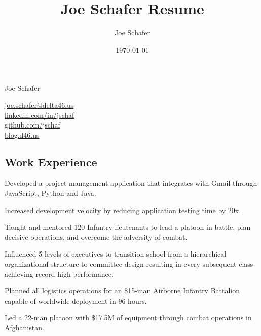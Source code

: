 \documentclass[letterpaper,11pt]{jschaf-resume}
\title{Joe Schafer Resume}
\author{Joe Schafer}
\date{\today}
\makeatletter
\newcommand*{\emailLink}{\href{mailto:joe.schafer@delta46.us}{joe.schafer@delta46.us}}
\newcommand*{\linkedInLink}{\href{http://linkedin.com/in/jschaf}{linkedin.com/in/jschaf}}
\newcommand*{\githubLink}{\href{http://github.com/jschaf}{github.com/jschaf}}
\newcommand*{\blogLink}{\href{http://blog.d46.us}{blog.d46.us}}
\newcommand*{\action}[1]{{\semibold #1}}
\makeatother
\begin{document}

\setlength{\columnsep}{3em}

\begin{paracol}{2}
{\fontfamily{\sfdefault}\fontsize{36px}{48px}\selectfont Joe Schafer}

\switchcolumn
{\fontfamily\sfdefault\selectfont
\emailLink\\
\linkedInLink\\
\githubLink\\
\blogLink\\
}
\end{paracol}

\begin{paracol}{2}
\section*{Work Experience}

\vspace{-12pt}
\begin{workitems}
  \item \action{Developed} a project management application that integrates with Gmail
    through JavaScript, Python and Java.
  \item \action{Increased} development velocity by reducing application testing time by
    20x.
\end{workitems}

\begin{workitems}
\item \action{Taught} and \action{mentored} 120 Infantry lieutenants to lead a
  platoon in battle, plan decisive operations, and overcome the adversity of
  combat.
\item \action{Influenced} 5 levels of executives to transition school from a
  hierarchical organizational structure to committee design resulting in every
  subsequent class achieving record high performance.
\end{workitems}

\begin{workitems}
\item \action{Planned} all logistics operations for an 815-man Airborne Infantry
  Battalion capable of worldwide deployment in 96 hours.

\item \action{Led} a 22-man platoon with \$17.5M of equipment through combat operations
  in Afghanistan.


\end{workitems}
\end{paracol}
\end{document}

